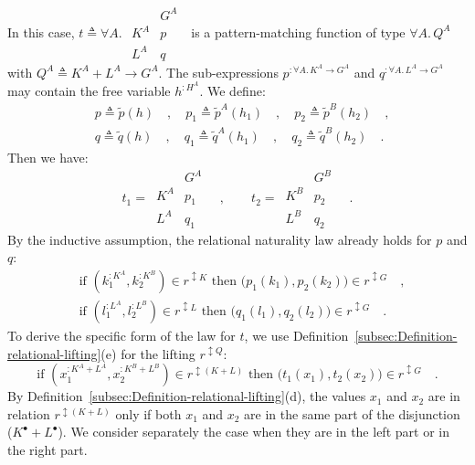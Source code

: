 In this case, $t\triangleq\forall A.\,\,\begin{array}{|c||c|}
 & G^{A}\\
\hline K^{A} & p\\
L^{A} & q
\end{array}\,\,$ is a pattern-matching function of type $\forall A.\,Q^{A}$ with
$Q^{A}\triangleq K^{A}+L^{A}\rightarrow G^{A}$. The sub-expressions
$p^{:\forall A.\,K^{A}\rightarrow G^{A}}$ and $q^{:\forall A.\,L^{A}\rightarrow G^{A}}$
may contain the free variable $h^{:H^{A}}$. We define:
\begin{align*}
 & p\triangleq\tilde{p}(h)\quad,\quad p_{1}\triangleq\tilde{p}^{A}(h_{1})\quad,\quad p_{2}\triangleq\tilde{p}^{B}(h_{2})\quad,\\
 & q\triangleq\tilde{q}(h)\quad,\quad q_{1}\triangleq\tilde{q}^{A}(h_{1})\quad,\quad q_{2}\triangleq\tilde{q}^{B}(h_{2})\quad.
\end{align*}
Then we have:
\[
t_{1}=\,\begin{array}{|c||c|}
 & G^{A}\\
\hline K^{A} & p_{1}\\
L^{A} & q_{1}
\end{array}\quad,\quad\quad t_{2}=\,\begin{array}{|c||c|}
 & G^{B}\\
\hline K^{B} & p_{2}\\
L^{B} & q_{2}
\end{array}\quad.
\]
By the inductive assumption, the relational naturality law already
holds for $p$ and $q$:
\begin{align*}
 & \text{if }(k_{1}^{:K^{A}},k_{2}^{:K^{B}})\in r^{\updownarrow K}\text{ then }\big(p_{1}(k_{1}),p_{2}(k_{2})\big)\in r^{\updownarrow G}\quad,\\
 & \text{if }(l_{1}^{:L^{A}},l_{2}^{:L^{B}})\in r^{\updownarrow L}\text{ then }\big(q_{1}(l_{1}),q_{2}(l_{2})\big)\in r^{\updownarrow G}\quad.
\end{align*}
To derive the specific form of the law for $t$, we use Definition~\ref{subsec:Definition-relational-lifting}(e)
for the lifting $r^{\updownarrow Q}$:
\[
\text{if }(x_{1}^{:K^{A}+L^{A}},x_{2}^{:K^{B}+L^{B}})\in r^{\updownarrow(K+L)}\text{ then }\big(t_{1}(x_{1}),t_{2}(x_{2})\big)\in r^{\updownarrow G}\quad.
\]
By Definition~\ref{subsec:Definition-relational-lifting}(d), the
values $x_{1}$ and $x_{2}$ are in relation $r^{\updownarrow(K+L)}$
only if both $x_{1}$ and $x_{2}$ are in the same part of the disjunction
($K^{\bullet}+L^{\bullet}$). We consider separately the case when
they are in the left part or in the right part.

